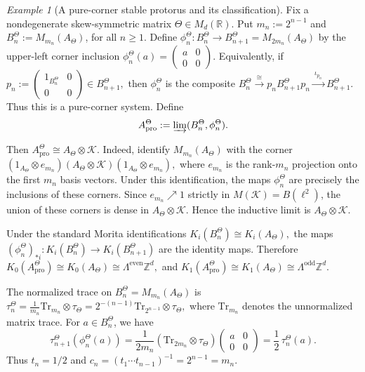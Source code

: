\documentclass[11pt]{amsart}
\theoremstyle{definition}
\theoremstyle{remark}
\newtheorem{example}[theorem]{Example}
\newcommand{\Z}{\mathbb{Z}}
\newcommand{\R}{\mathbb{R}}
\newcommand{\K}{\ensuremath{\mathcal{K}}}
\newcommand{\Tr}{\mathrm{Tr}}
\newcommand{\ex}{\mathrm{pro}}
\begin{document}
\begin{example}[A pure-corner stable protorus and its classification]
\label{ex:stable-corner}
Fix a nondegenerate skew-symmetric matrix $\Theta\in M_d(\R)$. Put $m_n:=2^{n-1}$ and $B_n^\Theta:=M_{m_n}(A_\Theta)$,
for all $n\geq1$. Define $\phi_n^\Theta\colon B_n^\Theta\longrightarrow B_{n+1}^\Theta
=M_{2m_n}(A_\Theta)$
by the upper-left corner inclusion $\phi_n^\Theta(a)=
\begin{pmatrix}
a&0\\
0&0
\end{pmatrix}.$
Equivalently, if $p_n:=
\begin{pmatrix}
1_{B_n^\Theta}&0\\
0&0
\end{pmatrix}
\in B_{n+1}^\Theta,$
then \(\phi_n^\Theta\) is the composite $
B_n^\Theta
\xrightarrow{\ \cong\ }
p_nB_{n+1}^\Theta p_n
\xrightarrow{\ \iota_{p_n}\ }
B_{n+1}^\Theta.$
Thus this is a pure-corner system. Define
\[
A_{\ex}^{\Theta}
:=
\varinjlim(B_n^\Theta,\phi_n^\Theta).
\]

Then $A_{\ex}^{\Theta}\cong A_\Theta\otimes\K.$
Indeed, identify $M_{m_n}(A_\Theta)$ with the corner $(1_{A_\Theta}\otimes e_{m_n})
(A_\Theta\otimes\K)
(1_{A_\Theta}\otimes e_{m_n}),$
where $e_{m_n}$ is the rank-$m_n$ projection onto the first $m_n$ basis
vectors. Under this identification, the maps $\phi_n^\Theta$ are precisely
the inclusions of these corners. Since $e_{m_n}\nearrow 1$ strictly in $M(\K)=B(\ell^2)$, the union of these corners is dense in
$A_\Theta\otimes\K$. Hence the inductive limit is $A_\Theta\otimes\K$.

Under the standard Morita identifications $K_i(B_n^\Theta)\cong K_i(A_\Theta),$ 
the maps $(\phi_n^\Theta)_{*i}\colon K_i(B_n^\Theta)\to K_i(B_{n+1}^\Theta)$
are the identity maps. Therefore
$K_0(A_{\ex}^{\Theta})
\cong K_0(A_\Theta)
\cong \Lambda^{\mathrm{even}}\Z^d,$
and $K_1(A_{\ex}^{\Theta})
\cong K_1(A_\Theta)
\cong \Lambda^{\mathrm{odd}}\Z^d.$

The normalized trace on
$B_n^\Theta=M_{m_n}(A_\Theta)$
is $\tau_n^\Theta=\frac{1}{m_n}\Tr_{m_n}\otimes\tau_\Theta=2^{-(n-1)}\Tr_{2^{n-1}}\otimes\tau_\Theta,$
where $\Tr_{m_n}$ denotes the unnormalized matrix trace. For
$a\in B_n^\Theta$, we have
\[
\tau_{n+1}^\Theta(\phi_n^\Theta(a))
=
\frac{1}{2m_n}
(\Tr_{2m_n}\otimes\tau_\Theta)
\begin{pmatrix}
a&0\\
0&0
\end{pmatrix}
=
\frac12\,\tau_n^\Theta(a).
\]
Thus $t_n=1/2$ and $c_n=(t_1\cdots t_{n-1})^{-1}=2^{n-1}=m_n.$


\end{example}
\end{document}
